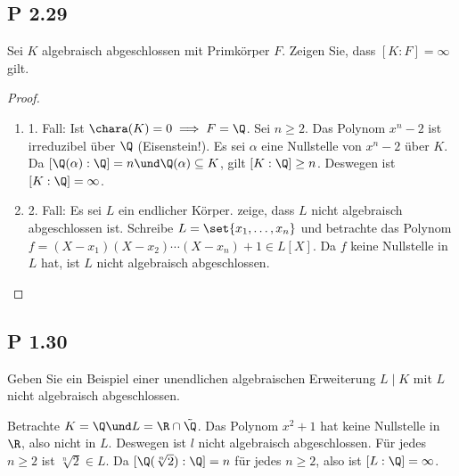 
\subsection{P 2.29}
Sei $K$ algebraisch abgeschlossen mit Primkörper $F$. Zeigen Sie, dass $[K:F] = \infty$ gilt.

\begin{proof}\
	\begin{enumerate}[label=]
		\item 1. Fall: Ist $\chara(K) = 0 \implies F = \Q$. Sei $n \ge 2$. Das Polynom $x^n -2$ ist irreduzibel über $\Q$ (Eisenstein!). Es sei $\alpha$ eine Nullstelle von $x^n -2$ über $K$. Da $[\Q(\alpha) : \Q] = n \und \Q(\alpha) \subseteq K$, gilt $[K:\Q] \ge n$. Deswegen ist $[K:\Q] = \infty$.
		\item 2. Fall: Es sei $L$ ein endlicher Körper. zeige, dass $L$ nicht algebraisch abgeschlossen ist. Schreibe $L = \set{x_1 , \dots, x_n}$ und betrachte das Polynom $f = (X - x_1)(X - x_2)\cdots (X-x_n) + 1 \in L[X]$. Da $f$ keine Nullstelle in $L$ hat, ist $L$ nicht algebraisch abgeschlossen. 
	\end{enumerate}
\end{proof}


\subsection{P 1.30}
Geben Sie ein Beispiel einer unendlichen algebraischen Erweiterung $L\mid K$ mit $L$ nicht algebraisch abgeschlossen.
\begin{lösung}
	Betrachte $K = \Q \und L = \R \cap \tilde{\Q}$. Das Polynom $x^2 +1$ hat keine Nullstelle in $\R$, also nicht in $L$. Deswegen ist $l$ nicht algebraisch abgeschlossen. Für jedes $n \ge 2$ ist $\sqrt[n]{2} \in L$. Da $[\Q(\sqrt[n]{2}):\Q] = n$ für jedes $n \ge 2$, also ist $[L:\Q] = \infty$.
\end{lösung}